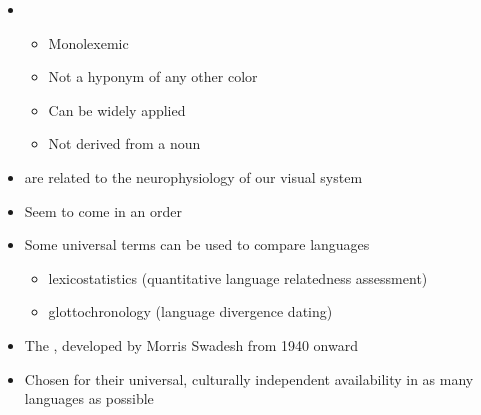 \documentclass[headrule,footrule]{foils}
\begin{document}
\begin{itemize}
\item {}
  \begin{itemize}
  \item Monolexemic
  \item Not a hyponym of any other color
  \item Can be widely applied
  \item Not derived from a noun
  \end{itemize}
\item {} are related to the neurophysiology of our visual system
\item Seem to come in an order \\
\hspace*{-4em}
\end{itemize}

\begin{itemize}
\item Some universal terms can be used to compare languages
  \begin{itemize}
  \item lexicostatistics (quantitative language relatedness assessment)
  \item glottochronology (language divergence dating)
\end{itemize}
\item The , developed by Morris Swadesh from 1940
  onward 
\item Chosen for their universal, culturally independent availability in as many languages as possible
\end{itemize}
\end{document}
